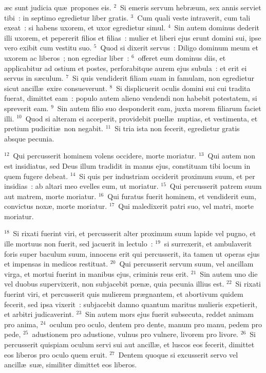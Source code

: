 \bchapter
{}\ae c sunt judicia qu\ae\ propones eis.
${}^{2}$~Si emeris servum hebr\ae um, sex annis serviet tibi~: in septimo egredietur liber gratis.
${}^{3}$~Cum quali veste intraverit, cum tali exeat~: si habens uxorem, et uxor egredietur simul.
${}^{4}$~Sin autem dominus dederit illi uxorem, et pepererit filios et filias~: mulier et liberi ejus erunt domini sui, ipse vero exibit cum vestitu suo.
${}^{5}$~Quod si dixerit servus~: Diligo dominum meum et uxorem ac liberos~; non egrediar liber~:
${}^{6}$~offeret eum dominus diis, et applicabitur ad ostium et postes, perforabitque aurem ejus subula~: et erit ei servus in s\ae culum.
${}^{7}$~Si quis vendiderit filiam suam in famulam, non egredietur sicut ancill\ae\ exire consueverunt.
${}^{8}$~Si displicuerit oculis domini sui cui tradita fuerat, dimittet eam~: populo autem alieno vendendi non habebit potestatem, si spreverit eam.
${}^{9}$~Sin autem filio suo desponderit eam, juxta morem filiarum faciet illi.
${}^{10}$~Quod si alteram ei acceperit, providebit puell\ae\ nuptias, et vestimenta, et pretium pudiciti\ae\ non negabit.
${}^{11}$~Si tria ista non fecerit, egredietur gratis absque pecunia.


${}^{12}$~Qui percusserit hominem volens occidere, morte moriatur.
${}^{13}$~Qui autem non est insidiatus, sed Deus illum tradidit in manus ejus, constituam tibi locum in quem fugere debeat.
${}^{14}$~Si quis per industriam occiderit proximum suum, et per insidias~: ab altari meo evelles eum, ut moriatur.
${}^{15}$~Qui percusserit patrem suum aut matrem, morte moriatur.
${}^{16}$~Qui furatus fuerit hominem, et vendiderit eum, convictus nox\ae , morte moriatur.
${}^{17}$~Qui maledixerit patri suo, vel matri, morte moriatur.


${}^{18}$~Si rixati fuerint viri, et percusserit alter proximum suum lapide vel pugno, et ille mortuus non fuerit, sed jacuerit in lectulo~:
${}^{19}$~si surrexerit, et ambulaverit foris super baculum suum, innocens erit qui percusserit, ita tamen ut operas ejus et impensas in medicos restituat.
${}^{20}$~Qui percusserit servum suum, vel ancillam virga, et mortui fuerint in manibus ejus, criminis reus erit.
${}^{21}$~Sin autem uno die vel duobus supervixerit, non subjacebit pœn\ae , quia pecunia illius est.
${}^{22}$~Si rixati fuerint viri, et percusserit quis mulierem pr\ae gnantem, et abortivum quidem fecerit, sed ipsa vixerit~: subjacebit damno quantum maritus mulieris expetierit, et arbitri judicaverint.
${}^{23}$~Sin autem mors ejus fuerit subsecuta, reddet animam pro anima,
${}^{24}$~oculum pro oculo, dentem pro dente, manum pro manu, pedem pro pede,
${}^{25}$~adustionem pro adustione, vulnus pro vulnere, livorem pro livore.
${}^{26}$~Si percusserit quispiam oculum servi sui aut ancill\ae , et luscos eos fecerit, dimittet eos liberos pro oculo quem eruit.
${}^{27}$~Dentem quoque si excusserit servo vel ancill\ae\ su\ae , similiter dimittet eos liberos.


